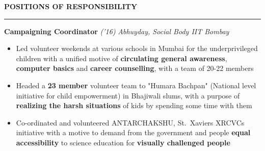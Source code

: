 \documentclass[10 pt]{article}%
\begin{document}
{{{{{{{{{{\begin{flushleft}\bf{\large{POSITIONS OF RESPONSIBILITY}}\end{flushleft}
\vspace{-1.5mm}
\hrule
{\flushleft \textbf {\large{Campaigning Coordinator}} \hfill {{{\em{('16)}}}}
	\vspace{-0.8em}
	{\flushleft \em{Abhuyday, Social Body IIT Bombay}}
	\vspace{-5pt}
	\begin{itemize}[leftmargin=*]
		\setlength\itemsep{1pt}
		\setlength\parskip{1pt}
		\item Led volunteer weekends at various schools in Mumbai for the underprivileged children with a unified motive of \textbf{circulating general awareness}, \textbf{computer basics} and \textbf{career counselling}, with a team of 20-22 members
		\item Headed a \textbf{23 member} volunteer team to "Humara Bachpan" (National level initiative for child empowerment) in Bhajiwali slums, with a purpose of \textbf{realizing the harsh situations} of kids by spending some time with them
		\item Co-ordinated and volunteered ANTARCHAKSHU, St.\ Xaviers XRCVCs initiative with a motive to demand from the government and people \textbf{equal accessibility} to science education for \textbf{visually challenged people}
	\end{itemize}
}}}}}}}}}}}
\end{document}
